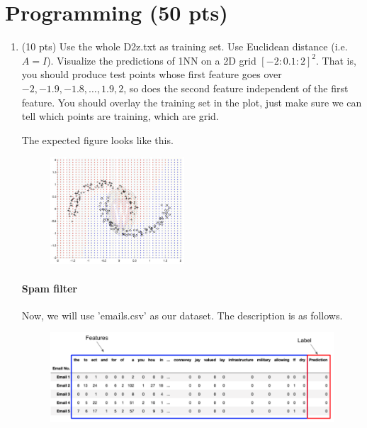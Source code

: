 \documentclass[a4paper]{article}
\theoremstyle{definition}
\begin{document}
\section{Programming (50 pts)}
\begin{enumerate}
	\item (10 pts) Use the whole D2z.txt as training set.  Use Euclidean distance (i.e. $A=I$).
	      Visualize the predictions of 1NN on a 2D grid $[-2:0.1:2]^2$.
	      That is, you should produce test points whose first feature goes over $-2, -1.9, -1.8, \ldots, 1.9, 2$, so does the second feature independent of the first feature.
	      You should overlay the training set in the plot, just make sure we can tell which points are training, which are grid.

	      The expected figure looks like this.
	      \begin{figure}[h]
		      \centering
		      \includegraphics[width=5cm]{implementation1_expected_result.png}
	      \end{figure}

	      \paragraph{Spam filter} Now, we will use 'emails.csv' as our dataset. The description is as follows.
	      \begin{figure}[h]
		      \centering
		      \includegraphics[width=\linewidth]{email_head.png}
	      \end{figure}


\end{enumerate}
\end{document}
